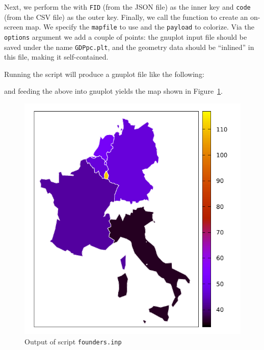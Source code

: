 \documentclass{article}
\begin{document}
Next, we perform the  with \texttt{FID} (from the JSON file)
as the inner key and \texttt{code} (from the CSV file) as the outer
key. Finally, we call the  function to create an
on-screen map. We specify the \texttt{mapfile} to use and the
\texttt{payload} to colorize. Via the \texttt{options} argument we add
a couple of points: the \textsf{gnuplot} input file should be saved
under the name \texttt{GDPpc.plt}, and the geometry data should be
``inlined'' in this file, making it self-contained.

Running the script will produce a gnuplot file like the following:


and feeding the above into \textsf{gnuplot} yields the map shown in
Figure~\ref{fig:founders}.

\begin{figure}[htbp]
  \begin{center}
  \includegraphics[scale=0.9]{GDPpc.pdf}
\end{center}
\caption{Output of script \texttt{founders.inp}}
\label{fig:founders}
\end{figure}
\end{document}
